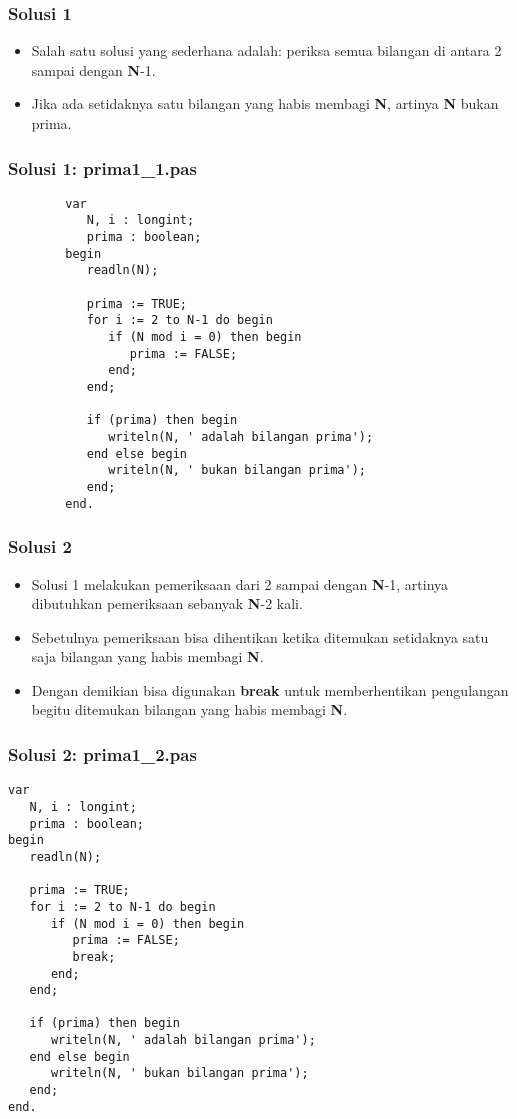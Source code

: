 \documentclass{beamer}
\begin{document}
\begin{frame}
\frametitle{Solusi 1}
\begin{itemize}
    \item Salah satu solusi yang sederhana adalah: periksa semua bilangan di antara 2 sampai dengan \textbf{N}-1.
    \item Jika ada setidaknya satu bilangan yang habis membagi \textbf{N}, artinya \textbf{N} bukan prima.
\end{itemize}
\end{frame}


\begin{frame}[fragile]
\frametitle{Solusi 1: prima1\_1.pas}
    \begin{lstlisting}
        var
           N, i : longint;
           prima : boolean;
        begin
           readln(N);

           prima := TRUE;
           for i := 2 to N-1 do begin
              if (N mod i = 0) then begin
                 prima := FALSE;
              end;
           end;

           if (prima) then begin
              writeln(N, ' adalah bilangan prima');
           end else begin
              writeln(N, ' bukan bilangan prima');
           end;
        end.
    \end{lstlisting}
\end{frame}

\begin{frame}
\frametitle{Solusi 2}
\begin{itemize}
    \item Solusi 1 melakukan pemeriksaan dari 2 sampai dengan \textbf{N}-1, artinya dibutuhkan pemeriksaan sebanyak \textbf{N}-2 kali.
    \item Sebetulnya pemeriksaan bisa dihentikan ketika ditemukan setidaknya satu saja bilangan yang habis membagi \textbf{N}.
    \item Dengan demikian bisa digunakan \textbf{break} untuk memberhentikan pengulangan begitu ditemukan bilangan yang habis membagi \textbf{N}.
\end{itemize}
\end{frame}

\begin{frame}[fragile]
\frametitle{Solusi 2: prima1\_2.pas}
\begin{lstlisting}
var
   N, i : longint;
   prima : boolean;
begin
   readln(N);

   prima := TRUE;
   for i := 2 to N-1 do begin
      if (N mod i = 0) then begin
         prima := FALSE;
         break;
      end;
   end;

   if (prima) then begin
      writeln(N, ' adalah bilangan prima');
   end else begin
      writeln(N, ' bukan bilangan prima');
   end;
end.
\end{lstlisting}
\end{frame}
\end{document}
